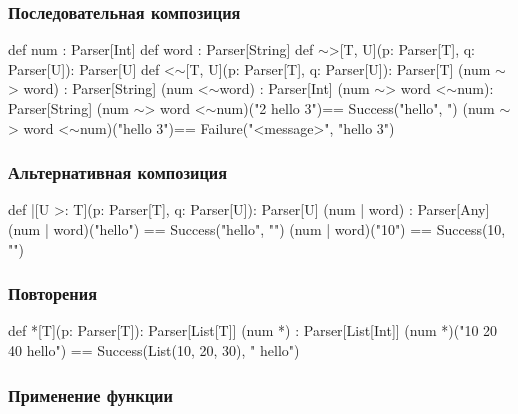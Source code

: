 \documentclass{beamer}
\newcommand{\mytilde}{$\sim$}
\begin{document}
\begin{frame}[fragile]
  \frametitle{Последовательная композиция}
  \begin{semiverbatim}
def num : Parser[Int]
def word : Parser[String]
\pause
def \mytilde>[T, U](p: Parser[T], q: Parser[U]): Parser[U]
def <\mytilde[T, U](p: Parser[T], q: Parser[U]): Parser[T]
\pause
(num \mytilde> word) : Parser[String]
(num <\mytilde word) : Parser[Int]
\pause
(num \mytilde> word <\mytilde num)\pause : Parser[String]
\pause
(num \mytilde> word <\mytilde num)("2 hello 3")\pause == Success("hello", ")
\pause
(num \mytilde> word <\mytilde num)("hello 3")\pause == Failure("<message>",
                                           "hello 3")
  \end{semiverbatim}
\end{frame}

\begin{frame}[fragile]
  \frametitle{Альтернативная композиция}
  \begin{semiverbatim}
def |[U >: T](p: Parser[T], q: Parser[U]): Parser[U]
\pause
(num | word) : Parser[Any]
\pause
(num | word)("hello") == Success("hello", "")
(num | word)("10") == Success(10, "")
  \end{semiverbatim}
\end{frame}

\begin{frame}[fragile]
  \frametitle{Повторения}
  \begin{semiverbatim}
def *[T](p: Parser[T]): Parser[List[T]]
\pause
(num *) : Parser[List[Int]]
\pause
(num *)("10 20 40 hello") == Success(List(10, 20, 30),
                                     " hello")
  \end{semiverbatim}
\end{frame}

\begin{frame}[fragile]
  \frametitle{Применение функции}
\end{frame}
\end{document}
